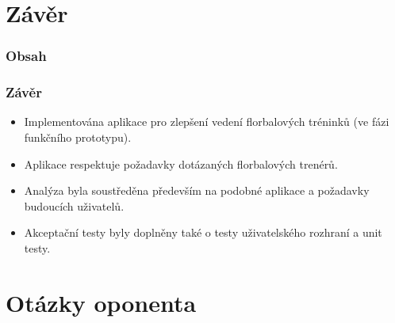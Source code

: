 \documentclass{beamer}
\begin{document}
\section{Závěr}

\begin{frame}
  \frametitle{Obsah}
  \tableofcontents[currentsection]
\end{frame}

\begin{frame}
  \frametitle{Závěr}

  \begin{itemize}
    \item Implementována aplikace pro zlepšení vedení florbalových tréninků (ve fázi funkčního prototypu).
    \item Aplikace respektuje požadavky dotázaných florbalových trenérů.
    \item Analýza byla soustředěna především na podobné aplikace a požadavky budoucích uživatelů.
    \item Akceptační testy byly doplněny také o testy uživatelského rozhraní a unit testy.
  \end{itemize}
\end{frame}

\section{Otázky oponenta}
\end{document}
